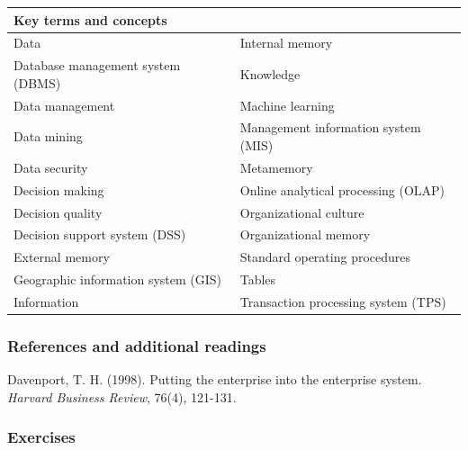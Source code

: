 \documentclass[
]{article}
\begin{document}
\begin{longtable}[]{@{}ll@{}}
\toprule
Key terms and concepts & \\
\midrule
\endhead
Data & Internal memory \\
Database management system (DBMS) & Knowledge \\
Data management & Machine learning \\
Data mining & Management information system (MIS) \\
Data security & Metamemory \\
Decision making & Online analytical processing (OLAP) \\
Decision quality & Organizational culture \\
Decision support system (DSS) & Organizational memory \\
External memory & Standard operating procedures \\
Geographic information system (GIS) & Tables \\
Information & Transaction processing system (TPS) \\
\bottomrule
\end{longtable}

\hypertarget{references-and-additional-readings}{%
\subsubsection*{References and additional readings}\label{references-and-additional-readings}}

Davenport, T. H. (1998). Putting the enterprise into the enterprise
system. \emph{Harvard Business Review}, 76(4), 121-131.

\hypertarget{exercises}{%
\subsubsection*{Exercises}\label{exercises}}
\end{document}
